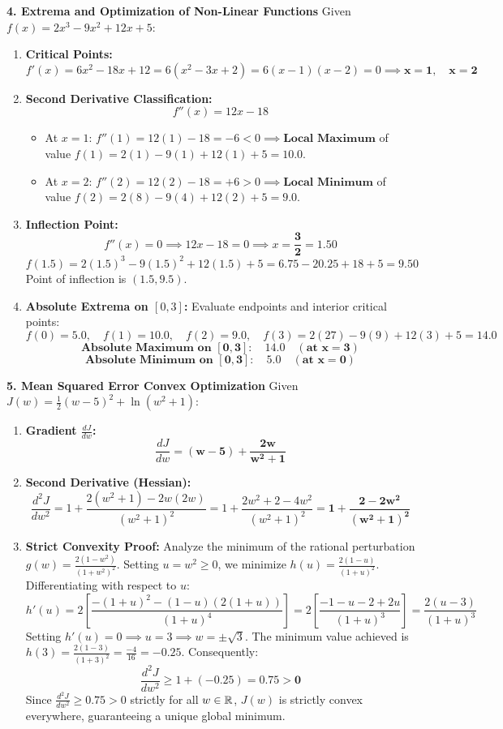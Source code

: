 \textbf{4. Extrema and Optimization of Non-Linear Functions}
Given $f(x) = 2x^3 - 9x^2 + 12x + 5$:
\begin{enumerate}
    \item \textbf{Critical Points:}
    $$f'(x) = 6x^2 - 18x + 12 = 6(x^2 - 3x + 2) = 6(x - 1)(x - 2) = 0 \implies \mathbf{x = 1, \quad x = 2}$$
    \item \textbf{Second Derivative Classification:}
    $$f''(x) = 12x - 18$$
    \begin{itemize}
        \item At $x = 1$: $f''(1) = 12(1) - 18 = -6 < 0 \implies \mathbf{\text{Local Maximum}}$ of value $f(1) = 2(1) - 9(1) + 12(1) + 5 = \mathbf{10.0}$.
        \item At $x = 2$: $f''(2) = 12(2) - 18 = +6 > 0 \implies \mathbf{\text{Local Minimum}}$ of value $f(2) = 2(8) - 9(4) + 12(2) + 5 = \mathbf{9.0}$.
    \end{itemize}
    \item \textbf{Inflection Point:}
    $$f''(x) = 0 \implies 12x - 18 = 0 \implies x = \mathbf{\frac{3}{2} = 1.50}$$
    $$f(1.5) = 2(1.5)^3 - 9(1.5)^2 + 12(1.5) + 5 = 6.75 - 20.25 + 18 + 5 = \mathbf{9.50}$$
    Point of inflection is $(1.5, 9.5)$.
    \item \textbf{Absolute Extrema on $[0, 3]$:}
    Evaluate endpoints and interior critical points:
    $$f(0) = 5.0, \quad f(1) = 10.0, \quad f(2) = 9.0, \quad f(3) = 2(27) - 9(9) + 12(3) + 5 = 14.0$$
    $$\mathbf{\text{Absolute Maximum on } [0, 3]: \quad 14.0 \quad (\text{at } x = 3)}$$
    $$\mathbf{\text{Absolute Minimum on } [0, 3]: \quad 5.0 \quad (\text{at } x = 0)}$$
\end{enumerate}

\textbf{5. Mean Squared Error Convex Optimization}
Given $J(w) = \frac{1}{2}(w - 5)^2 + \ln(w^2 + 1)$:
\begin{enumerate}
    \item \textbf{Gradient $\frac{dJ}{dw}$:}
    $$\frac{dJ}{dw} = \mathbf{(w - 5) + \frac{2w}{w^2 + 1}}$$
    \item \textbf{Second Derivative (Hessian):}
    $$\frac{d^2 J}{dw^2} = 1 + \frac{2(w^2 + 1) - 2w(2w)}{(w^2 + 1)^2} = 1 + \frac{2w^2 + 2 - 4w^2}{(w^2 + 1)^2} = \mathbf{1 + \frac{2 - 2w^2}{(w^2 + 1)^2}}$$
    \item \textbf{Strict Convexity Proof:}
    Analyze the minimum of the rational perturbation $g(w) = \frac{2(1 - w^2)}{(1 + w^2)^2}$.
    Setting $u = w^2 \ge 0$, we minimize $h(u) = \frac{2(1 - u)}{(1 + u)^2}$. Differentiating with respect to $u$:
    $$h'(u) = 2\left[\frac{-(1+u)^2 - (1-u)(2(1+u))}{(1+u)^4}\right] = 2\left[\frac{-1 - u - 2 + 2u}{(1+u)^3}\right] = \frac{2(u - 3)}{(1+u)^3}$$
    Setting $h'(u) = 0 \implies u = 3 \implies w = \pm\sqrt{3}$.
    The minimum value achieved is $h(3) = \frac{2(1 - 3)}{(1 + 3)^2} = \frac{-4}{16} = -0.25$.
    Consequently:
    $$\frac{d^2 J}{dw^2} \ge 1 + (-0.25) = \mathbf{0.75 > 0}$$
    Since $\frac{d^2 J}{dw^2} \ge 0.75 > 0$ strictly for all $w \in \mathbb{R}$, $J(w)$ is strictly convex everywhere, guaranteeing a unique global minimum.
\end{enumerate}

